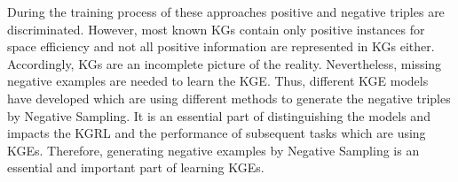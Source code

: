 During the training process of these approaches positive and negative triples are discriminated.
However, most known \acp{KG} contain only positive instances for space efficiency \cite{qiannegative} and not all positive information are represented in \acp{KG} either.
Accordingly, \acp{KG} are an incomplete picture of the reality.
Nevertheless, missing negative examples are needed to learn the \ac{KGE}.
Thus, different \ac{KGE} models have developed which are using different methods to generate the negative triples by Negative Sampling.
It is an essential part of distinguishing the models \cite{Ruffinelli2020You} and impacts the \ac{KGRL} and the performance of subsequent tasks which are using \acp{KGE}. 
Therefore, generating negative examples by Negative Sampling is an essential and important part of learning \acp{KGE}.


















